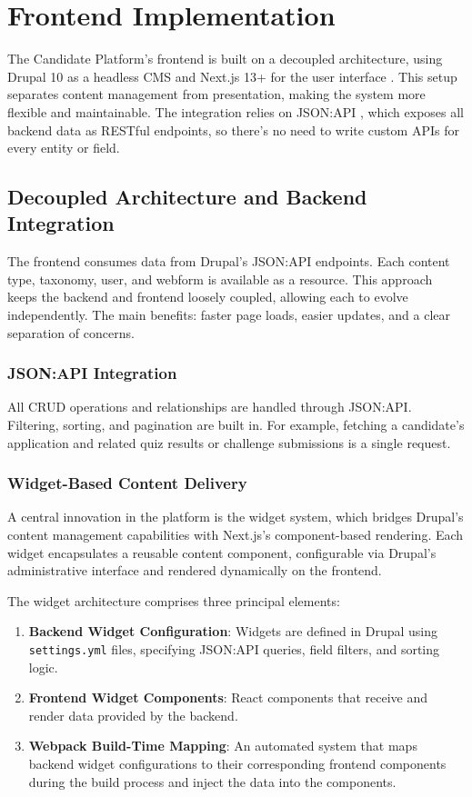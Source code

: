 \section{Frontend Implementation}
\label{sec:frontend_implementation}

The Candidate Platform's frontend is built on a decoupled architecture, using Drupal 10 as a headless CMS and Next.js 13+ for the user interface \cite{newman2015building}. This setup separates content management from presentation, making the system more flexible and maintainable. The integration relies on JSON:API \cite{dries2019headless}, which exposes all backend data as RESTful endpoints, so there's no need to write custom APIs for every entity or field.

\subsection{Decoupled Architecture and Backend Integration}

The frontend consumes data from Drupal's JSON:API endpoints. Each content type, taxonomy, user, and webform is available as a resource. This approach keeps the backend and frontend loosely coupled, allowing each to evolve independently. The main benefits: faster page loads, easier updates, and a clear separation of concerns.

\subsubsection{JSON:API Integration}

All CRUD operations and relationships are handled through JSON:API. Filtering, sorting, and pagination are built in. For example, fetching a candidate's application and related quiz results or challenge submissions is a single request.

\subsubsection{Widget-Based Content Delivery}
\noindent
A central innovation in the platform is the widget system, which bridges Drupal's content management capabilities with Next.js's component-based rendering. Each widget encapsulates a reusable content component, configurable via Drupal's administrative interface and rendered dynamically on the frontend.

The widget architecture comprises three principal elements:

\begin{enumerate}
    \item \textbf{Backend Widget Configuration}: Widgets are defined in Drupal using \texttt{settings.yml} files, specifying JSON:API queries, field filters, and sorting logic.
    \item \textbf{Frontend Widget Components}: React components that receive and render data provided by the backend.
    \item \textbf{Webpack Build-Time Mapping}: An automated system that maps backend widget configurations to their corresponding frontend components during the build process and inject the data into the components.
\end{enumerate}

